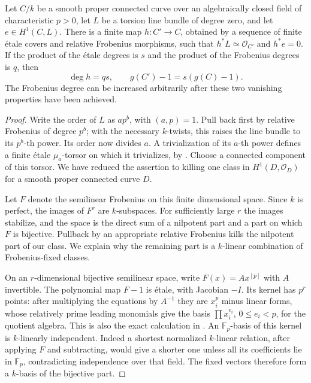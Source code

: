 \begin{lemma}
\label{D:torsion-first-obstruction-cover}
Let $C/k$ be a smooth proper connected curve over an
algebraically closed field of characteristic $p>0$, let
$L$ be a torsion line bundle of degree zero, and let
$e\in H^1(C,L)$.  There is a finite map $h:C'\to C$,
obtained by a sequence of finite \'etale covers and relative
Frobenius morphisms, such that $h^*L\simeq\mathcal O_{C'}$
and $h^*e=0$.  If the product of the \'etale degrees is $s$
and the product of the Frobenius degrees is $q$, then
\[
             \deg h=qs,\qquad g(C')-1=s(g(C)-1).
\]
The Frobenius degree can be increased arbitrarily after
these two vanishing properties have been achieved.
\end{lemma}

\begin{proof}
Write the order of $L$ as $ap^b$, with $(a,p)=1$.
Pull back first by relative Frobenius of degree $p^b$;
with the necessary $k$-twists, this raises the line bundle
to its $p^b$-th power.  Its order now divides $a$.
A trivialization of its $a$-th power defines a finite
\'etale $\mu_a$-torsor on which it trivializes, by
\cite[Lemmas 59.28.1 and 59.28.5, section 03PK]
{StacksBFiniteCone}.  Choose a connected component of this
torsor.  We have reduced the assertion to killing one class
in $H^1(D,\mathcal O_D)$ for a smooth proper connected curve
$D$.

Let $F$ denote the semilinear Frobenius on this finite
dimensional space.  Since $k$ is perfect, the images of
$F^r$ are $k$-subspaces.  For sufficiently large $r$ the
images stabilize, and the space is the direct sum of a
nilpotent part and a part on which $F$ is bijective.
Pullback by an appropriate relative Frobenius kills the
nilpotent part of our class.  We explain why the remaining
part is a $k$-linear combination of Frobenius-fixed classes.

On an $r$-dimensional bijective semilinear space, write
$F(x)=A x^{[p]}$ with $A$ invertible.  The polynomial map
$F-1$ is \'etale, with Jacobian $-I$.  Its kernel has
$p^r$ points: after multiplying the equations by $A^{-1}$
they are $x_i^p$ minus linear forms, whose relatively
prime leading monomials give the basis
$\prod x_i^{e_i}$, $0\leq e_i<p$, for the quotient algebra.
This is also the exact calculation in
\cite[Lemma 59.63.2, section 0A3J]{StacksBFiniteCone}.
An $\mathbb F_p$-basis of this kernel is $k$-linearly
independent.  Indeed a shortest normalized $k$-linear
relation, after applying $F$ and subtracting, would give
a shorter one unless all its coefficients lie in
$\mathbb F_p$, contradicting independence over that field.
The fixed vectors therefore form a $k$-basis of the
bijective part.


\end{proof}
